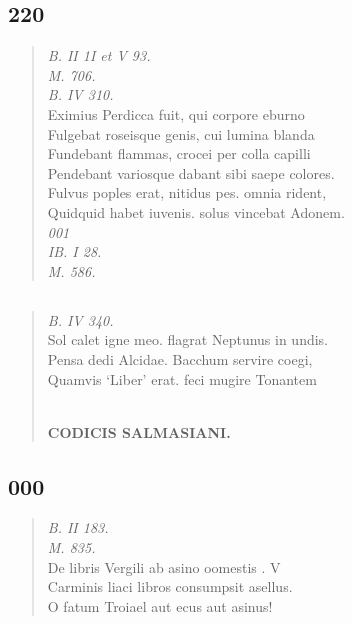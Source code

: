 \documentclass[11pt, a4paper]{report}
\begin{document}
            \subsection*{220}
      \begin{verse}
      \textit{B. II 1I et V 93.} \\ \textit{M. 706.} \\ \textit{B. IV 310.} \\ Eximius Perdicca fuit, qui corpore eburno \\ Fulgebat roseisque genis, cui lumina blanda \\ Fundebant flammas, crocei per colla capilli \\ Pendebant variosque dabant sibi saepe colores. \\ Fulvus poples erat, nitidus pes. omnia rident, \\ Quidquid habet iuvenis. solus vincebat Adonem. \\ \textit{001} \\ \textit{IB. I 28.} \\ \textit{M. 586.} \\ 
      \end{verse}
  
            \subsection*{}
      \begin{verse}
      \textit{B. IV 340.} \\ Sol calet igne meo. flagrat Neptunus in undis. \\ Pensa dedi Alcidae. Bacchum servire coegi, \\ Quamvis ‘Liber’ erat.  \lbrack feci mugire Tonantem \rbrack  \\ 
        ﻿\pagebreak 
    \begin{center} \textbf{CODICIS SALMASIANI.} \end{center} \marginpar{[187]} 
      \end{verse}
  
            \subsection*{000}
      \begin{verse}
      \textit{B. II 183.} \\ \textit{M. 835.} \\ De libris Vergili ab asino oomestis . V \\ Carminis liaci libros consumpsit asellus. \\ O fatum Troiael aut ecus aut asinus! \\ 
      \end{verse}
  
\end{document}
